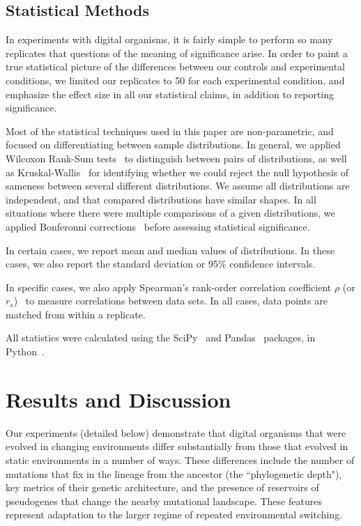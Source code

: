 \documentclass[10pt,letterpaper,final]{article}
\begin{document}
\subsection*{Statistical Methods}
In experiments with digital organisms, it is fairly simple to perform so many replicates that questions of the meaning of significance arise. In order to paint a true statistical picture of the differences between our controls and experimental conditions, we limited our replicates to 50 for each experimental condition, and emphasize the effect size in all our statistical claims, in addition to reporting significance.

Most of the statistical techniques used in this paper are non-parametric, and focused on differentiating between sample distributions. In general, we applied Wilcoxon Rank-Sum tests~\cite{wilcoxon_individual_1945} to distinguish between pairs of distributions, as well as Kruskal-Wallis~\cite{kruskal_use_1952} for identifying whether we could reject the null hypothesis of sameness between several different distributions. We assume all distributions are independent, and that compared distributions have similar shapes. In all situations where there were multiple comparisons of a given distributions, we applied Bonferonni corrections~\cite{rice_analyzing_1989} before assessing statistical significance. 

In certain cases, we report mean and median values of distributions. In these cases, we also report the standard deviation or 95\% confidence intervals.

In specific cases, we also apply Spearman's rank-order correlation coefficient $\rho$ (or $r_{s}$)~\cite{spearman_proof_1904} to measure correlations between data sets. In all cases, data points are matched from within a replicate.

All statistics were calculated using the SciPy~\cite{jones_scipy:_2014} and Pandas~\cite{mckinney_data_2010} packages, in Python~\cite{vanrossum_python_2010}.

\section*{Results and Discussion}
Our experiments (detailed below) demonstrate that digital organisms that were evolved in changing environments differ substantially from those that evolved in static environments in a number of ways. These differences include the number of mutations that fix in the lineage from the ancestor (the ``phylogenetic depth"), key metrics of their genetic architecture, and the presence of reservoirs of pseudogenes that change the nearby mutational landscape. These features represent adaptation to the larger regime of repeated environmental switching. 
\end{document}
